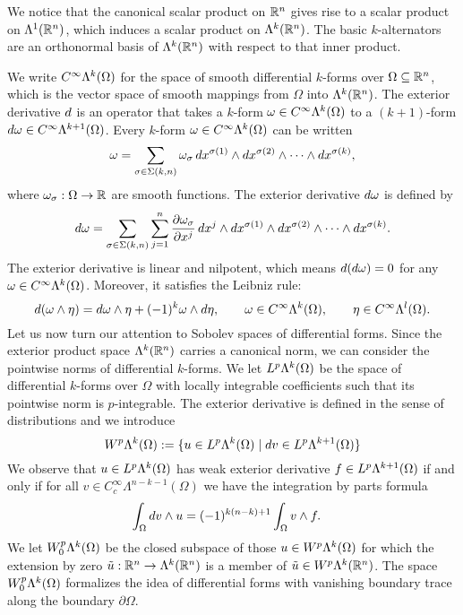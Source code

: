 \documentclass[12pt,a4paper]{article}
\begin{document}
We notice that the canonical scalar product on ${\mathbb R}^{n}$ gives rise to a scalar product on $\Lambda^{1}({\mathbb R}^{n})$,
which induces a scalar product on $\Lambda^{k}({\mathbb R}^{n})$.
The basic $k$-alternators are an orthonormal basis of $\Lambda^{k}({\mathbb R}^{n})$ with respect to that inner product. 

We write $C^{\infty}\Lambda^{k}(\Omega)$ for the space of smooth differential $k$-forms over $\Omega \subseteq {\mathbb R}^{n}$,
which is the vector space of smooth mappings from $\Omega$ into $\Lambda^{k}({\mathbb R}^{n})$.
The exterior derivative \( d \) is an operator that takes a \( k \)-form \( \omega \in C^{\infty}\Lambda^{k}(\Omega) \) 
to a \((k+1)\)-form \( d\omega \in C^{\infty}\Lambda^{k+1}(\Omega) \). 
Every \( k \)-form \( \omega \in C^{\infty}\Lambda^{k}(\Omega) \) can be written 
\[
    \omega = 
    \sum_{ \sigma \in \Sigma(k,n) } 
    \omega_{\sigma} \, 
    dx^{\sigma(1)} \wedge dx^{\sigma(2)} \wedge \cdots \wedge dx^{\sigma(k)},
\]
where \( \omega_{\sigma} : \Omega \rightarrow {\mathbb R} \) are smooth functions.
The exterior derivative \( d\omega \) is defined by
\[
    d\omega = 
    \sum_{ \sigma \in \Sigma(k,n) } 
    \sum_{j=1}^{n} 
    \frac{\partial \omega_{\sigma}}{\partial x^j} 
    \, dx^j \wedge 
    dx^{\sigma(1)} \wedge dx^{\sigma(2)} \wedge \cdots \wedge dx^{\sigma(k)}.
\]
The exterior derivative is linear and nilpotent, which means 
\( d(d\omega) = 0 \) for any \( \omega \in C^{\infty}\Lambda^{k}(\Omega) \).
Moreover, it satisfies the Leibniz rule:
\[ 
    d(\omega \wedge \eta) 
    = 
    d\omega \wedge \eta + (-1)^{k} \omega \wedge d\eta, 
    \qquad \omega \in C^{\infty}\Lambda^{k}(\Omega), 
    \qquad \eta \in C^{\infty}\Lambda^{l}(\Omega).
\]
Let us now turn our attention to Sobolev spaces of differential forms. 
Since the exterior product space $\Lambda^{k}({\mathbb R}^{n})$ carries a canonical norm, we can consider the pointwise norms of differential $k$-forms. 
We let $L^{p}\Lambda^{k}(\Omega)$ be the space of differential $k$-forms over $\Omega$ with locally integrable coefficients 
such that its pointwise norm is $p$-integrable. 
The exterior derivative is defined in the sense of distributions and we introduce 
\[
    W^p\Alt^{k}(\Omega) 
    := 
    \{ u \in L^{p}\Alt^{k}(\Omega) \suchthat \cartan v \in L^{p}\Alt^{k+1}(\Omega) \}
\]
We observe that $u \in L^p\Lambda^{k}(\Omega)$ has weak exterior derivative $f \in L^p\Lambda^{k+1}(\Omega)$
if and only if for all $v \in C^{\infty}_{c}\Lambda^{n-k-1}(\Omega)$ we have the integration by parts formula
\begin{align*}
    \int_{\Omega} d v \wedge u
    &=
    (-1)^{k(n-k)+1}
    \int_{\Omega} v \wedge f 
    .
\end{align*}
We let $W^p_{0}\Lambda^{k}(\Omega)$ be the closed subspace of those $u \in W^p\Lambda^{k}(\Omega)$ 
for which the extension by zero $\tilde u : {\mathbb R}^{n} \rightarrow \Lambda^{k}({\mathbb R}^{n})$ is a member of $\tilde u \in W^p\Lambda^{k}({\mathbb R}^{n})$. 
The space $W^p_{0}\Lambda^{k}(\Omega)$ formalizes the idea of differential forms with vanishing boundary trace along the boundary $\partial\Omega$. 
\end{document}
